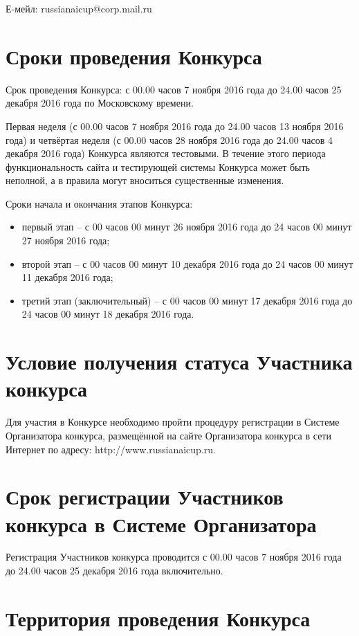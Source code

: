 Е-мейл: russianaicup@corp.mail.ru

\section{Сроки проведения Конкурса}

Срок проведения Конкурса: с 00.00 часов 7 ноября 2016 года до 24.00 часов 25 декабря 2016 года по Московскому времени.

Первая неделя (с 00.00 часов 7 ноября 2016 года до 24.00 часов 13 ноября 2016 года) и четвёртая неделя (с 00.00 часов 28 ноября 2016 года до
24.00 часов 4 декабря 2016 года) Конкурса являются тестовыми. В течение этого периода функциональность сайта и тестирующей системы Конкурса
может быть неполной, а в правила могут вноситься существенные изменения.

Сроки начала и окончания этапов Конкурса:
\begin{itemize}
\item первый этап – с 00 часов 00 минут 26 ноября 2016 года до 24 часов 00 минут 27 ноября 2016 года;
\item второй этап – с 00 часов 00 минут 10 декабря 2016 года до 24 часов 00 минут 11 декабря 2016 года;
\item третий этап (заключительный) – с 00 часов 00 минут 17 декабря 2016 года до 24 часов 00 минут 18 декабря 2016 года.
\end{itemize}

\section{Условие получения статуса Участника конкурса}

Для участия в Конкурсе необходимо пройти процедуру регистрации в Системе Организатора конкурса, размещённой на сайте Организатора конкурса в
сети Интернет по адресу: http://www.russianaicup.ru.

\section{Срок регистрации Участников конкурса в Системе Организатора}

Регистрация Участников конкурса проводится с 00.00 часов 7 ноября 2016 года до 24.00 часов 25 декабря 2016 года включительно.

\section{Территория проведения Конкурса}

